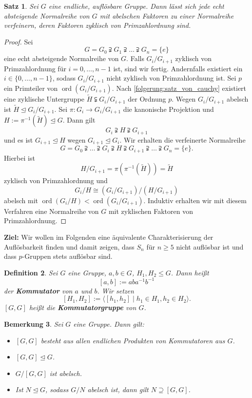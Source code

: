 \documentclass[a4paper, twoside, 11pt, ngerman]{report}
\DeclareMathOperator{\ord}{ord}
\theoremstyle{definistyle}
\newtheorem{satz}{Satz}[section]
\newtheorem{defini}[satz]{Definition}
\newtheorem{bem}[satz]{Bemerkung}
\theoremstyle{remark}
\newcommand{\defn}[1]{\textit{\bfseries #1}}
\begin{document}
\begin{satz}\label{satz:verfeinerung_normalreihe}
Sei $G$ eine endliche, auflösbare Gruppe. Dann lässt sich jede echt absteigende Normalreihe von $G$ mit abelschen Faktoren zu einer Normalreihe verfeinern, deren Faktoren zyklisch von Primzahlordnung sind.
\end{satz}

\begin{proof}
Sei
\[
G = G_0 \supsetneqq G_1 \supsetneqq \dots \supsetneqq G_n = \{e\}
\]
eine echt absteigende Normalreihe von $G$. Falls $G_i / G_{i+1}$ zyklisch von Primzahlordnung für $i = 0, \dots, n-1$ ist, sind wir fertig. Andernfalls existiert ein $i \in \{0, \dots, n-1\}$, sodass $G_i / G_{i+1}$ nicht zyklisch von Primzahlordnung ist. Sei $p$ ein Primteiler von $\ord(G_i / G_{i+1})$. Nach \ref{folgerung:satz_von_cauchy} existiert eine zyklische Untergruppe $\widetilde{H}\subsetneqq G_i / G_{i+1}$ der Ordnung $p$. Wegen $G_i / G_{i+1}$ abelsch ist $\widetilde{H} \trianglelefteq G_i / G_{i+1}$.
Sei $\pi \colon G_i \to G_i / G_{i+1}$ die kanonische Projektion und $H := \pi^{-1}(\widetilde{H})\trianglelefteq G$. Dann gilt
\[
G_i\supsetneqq H \supsetneqq G_{i+1}
\]
und es ist $G_{i+1} \trianglelefteq H$ wegen $G_{i+1} \trianglelefteq G_i$.
Wir erhalten die verfeinerte Normalreihe
\[
G = G_0 \supsetneqq \dots \supsetneqq G_i\supsetneqq H \supsetneqq G_{i+1} \supsetneqq \dots \supsetneqq G_n = \{e\}.
\]
Hierbei ist 
\[
H / G_{i+1} = \pi(\pi^{-1}(\widetilde{H})) = \widetilde{H}
\]
zyklisch von Primzahlordnung und
\[
G_i / H \cong (G_i / G_{i+1}) / (H / G_{i+1})
\]
abelsch mit $\ord(G_i / H) < \ord(G_i / G_{i+1})$.
Induktiv erhalten wir mit diesem Verfahren eine Normalreihe von $G$ mit zyklischen Faktoren von Primzahlordnung.
\end{proof}

\textbf{Ziel:} Wir wollen im Folgenden eine äquivalente Charakterisierung der Auflösbarkeit finden und damit zeigen, dass $S_n$ für $n\geq 5$ nicht auflösbar ist und dass $p$-Gruppen stets auflösbar sind.

\begin{defini}\label{def:kommutatorgruppe}
Sei $G$ eine Gruppe, $a, b \in G$, $H_1, H_2 \leq G$. Dann heißt
\[ [a, b] := ab a^{-1} b^{-1} \]
der \defn{Kommutator} von $a$ und $b$. Wir setzen
\[
[H_1, H_2] := \langle [h_1, h_2] \mid h_1 \in H_1, h_2 \in H_2 \rangle.
\]
$[G, G]$ heißt die \defn{Kommutatorgruppe} von $G$.
\end{defini}

\begin{bem}\label{bem:kommutatorgruppe}
Sei $G$ eine Gruppe. Dann gilt:
\begin{itemize}
\item[(a)] $[G, G]$ besteht aus allen endlichen Produkten von Kommutatoren aus $G$.
\item[(b)] $[G, G] \trianglelefteq G$.
\item[(c)] $G / [G, G]$ ist abelsch.
\item[(d)] Ist $N \trianglelefteq G$, sodass $G / N$ abelsch ist, dann gilt $N \supseteq [G, G]$.
\end{itemize}
\end{bem}
\end{document}
